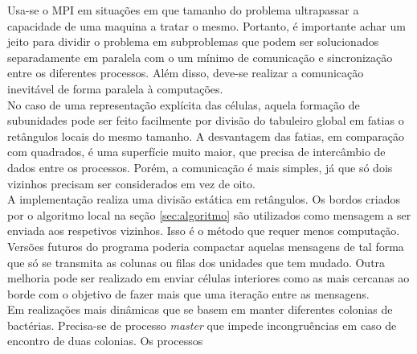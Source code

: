 \label{sec:distribuicao}

Usa-se o MPI em situações em que tamanho do problema ultrapassar a capacidade de uma maquina a tratar o mesmo. Portanto, é importante achar um jeito para dividir o problema em subproblemas que podem ser solucionados separadamente em paralela com o um mínimo de comunicação e sincronização entre os diferentes processos. Além disso, deve-se realizar a comunicação inevitável de forma paralela à computações. \\

No caso de uma representação explícita das células, aquela formação de subunidades pode ser feito facilmente por divisão do tabuleiro global em fatias o retângulos locais do mesmo tamanho. A desvantagem das fatias, em comparação com quadrados, é uma superfície muito maior, que precisa de intercâmbio de dados entre os processos. Porém, a comunicação é mais simples, já que só dois vizinhos precisam ser considerados em vez de oito.\\

A implementação realiza uma divisão estática em retângulos. Os bordos criados por o algoritmo local na seção \ref{sec:algoritmo} são utilizados como mensagem a ser enviada aos respetivos vizinhos. Isso é o método que requer menos computação. Versões futuros do programa poderia compactar aquelas mensagens de tal forma que só se transmita as colunas ou filas dos unidades que tem mudado. Outra melhoria pode ser realizado em enviar células interiores como as mais cercanas ao borde com o objetivo de fazer mais que uma iteração entre as mensagens.\\

Em realizações mais dinâmicas que se basem em manter diferentes colonias de bactérias. Precisa-se de processo \textit{master} que impede incongruências em caso de encontro de duas colonias. Os processos

